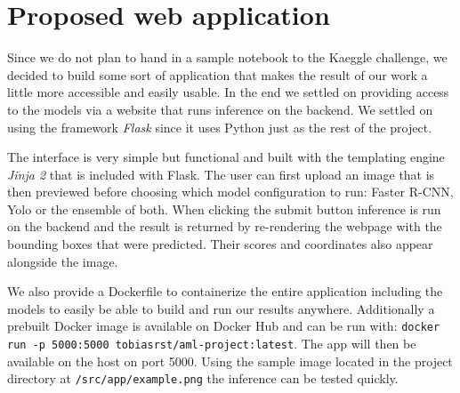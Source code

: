 \chapter{Proposed web application}\label{chapter:webapp}

Since we do not plan to hand in a sample notebook to the Kaeggle challenge, we decided to build some sort of application that makes the result of our work a little more accessible and easily usable. In the end we settled on providing access to the models via a website that runs inference on the backend. We settled on using the framework \textit{Flask} \autocite{ronacher_flask_nodate} since it uses Python just as the rest of the project.

The interface is very simple but functional and built with the templating engine \textit{Jinja 2} that is included with Flask. The user can first upload an image that is then previewed before choosing which model configuration to run: Faster R-CNN, Yolo or the ensemble of both. When clicking the submit button inference is run on the backend and the result is returned by re-rendering the webpage with the bounding boxes that were predicted. Their scores and coordinates also appear alongside the image. 

We also provide a Dockerfile to containerize the entire application including the models to easily be able to build and run our results anywhere. Additionally a prebuilt Docker image is available on Docker Hub and can be run with: \texttt{docker run -p 5000:5000 tobiasrst/aml-project:latest}. The app will then be available on the host on port 5000. Using the sample image located in the project directory at \texttt{/src/app/example.png} the inference can be tested quickly.